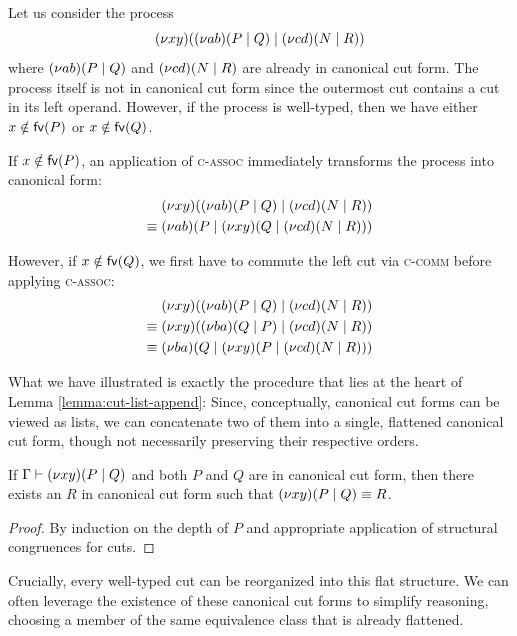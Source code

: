 \begin{example}
  Let us consider the process
  \[
    (\nu x y)((\nu a b)(P \mid Q) \mid (\nu c d)(N \mid R))
  \]
  where $(\nu a b)(P \mid Q)$ and $(\nu c d)(N \mid R)$ are already in canonical cut form.
  The process itself is not in canonical cut form since the outermost cut
  contains a cut in its left operand. However, if the process is well-typed,
  then we have either $x \notin \mathsf{fv}(P)$ or $x \notin \mathsf{fv}(Q)$.

  If $x \notin \mathsf{fv}(P)$, an application of \textsc{c-assoc} immediately
  transforms the process into canonical form:
  \begin{align*}
         &\;(\nu x y)((\nu a b)(P \mid Q) \mid (\nu c d)(N \mid R)) \\
  \equiv &\;(\nu a b)(P \mid (\nu x y)(Q \mid (\nu c d)(N \mid R)))
  \end{align*}

  However, if $x \notin \mathsf{fv}(Q)$, we first have to commute the left cut
  via \textsc{c-comm} before applying \textsc{c-assoc}:
  \begin{align*}
         &\;(\nu x y)((\nu a b)(P \mid Q) \mid (\nu c d)(N \mid R)) \\
  \equiv &\;(\nu x y)((\nu b a)(Q \mid P) \mid (\nu c d)(N \mid R)) \\
  \equiv &\;(\nu b a)(Q \mid (\nu x y)(P \mid (\nu c d)(N \mid R)))
  \end{align*}

  What we have illustrated is exactly the procedure that lies at the heart of
  Lemma \ref{lemma:cut-list-append}:
  Since, conceptually, canonical cut forms can be viewed as lists, we can
  concatenate two of them into a single, flattened canonical cut form,
  though not necessarily preserving their respective orders.
\end{example}

\begin{lemma} \label{lemma:cut-list-append}
  If $\Gamma \vdash (\nu x y)(P \mid Q)$ and both $P$ and $Q$ are in canonical
  cut form, then there exists an $R$ in canonical cut form such that $(\nu x y)(P \mid Q) \equiv R$.
\end{lemma}
\begin{proof}
  By induction on the depth of $P$ and appropriate application of structural congruences for cuts.
\end{proof}

Crucially, every well-typed cut can be reorganized into this flat structure.
We can often leverage the existence of these canonical cut forms to simplify
reasoning, choosing a member of the same equivalence class that is already
flattened.

